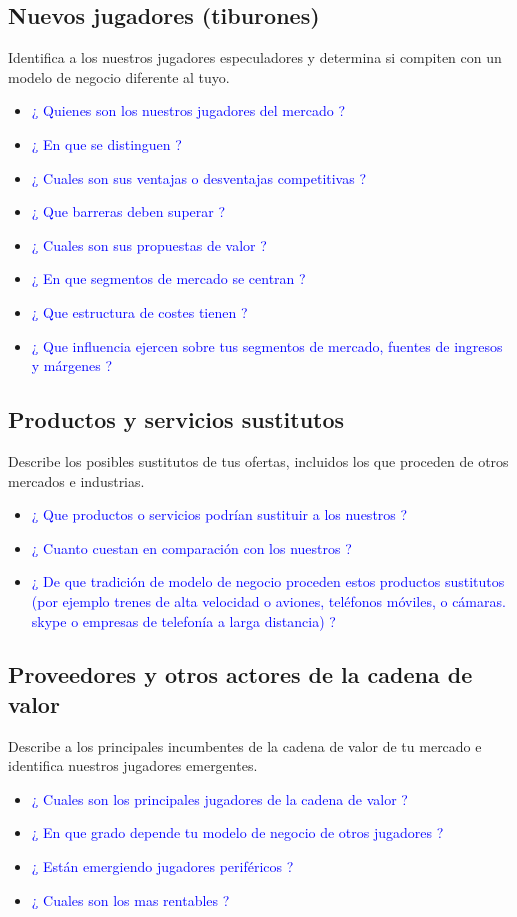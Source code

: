 \documentclass[11pt]{book}
\begin{document}
\subsection{Nuevos jugadores (tiburones)}
Identifica a los nuestros jugadores especuladores y determina si compiten con un modelo de negocio diferente al tuyo.
\begin{itemize}
\item\textcolor{blue}{¿ Quienes son los nuestros jugadores del mercado ?}
\item\textcolor{blue}{¿ En que se distinguen ?}
\item\textcolor{blue}{¿ Cuales son sus ventajas o desventajas competitivas ?}
\item\textcolor{blue}{¿ Que barreras deben superar ?}
\item\textcolor{blue}{¿ Cuales son sus propuestas de valor ?}
\item\textcolor{blue}{¿ En que segmentos de mercado se centran ?}
\item\textcolor{blue}{¿ Que estructura de costes tienen ?}
\item\textcolor{blue}{¿ Que influencia ejercen sobre tus segmentos de mercado, fuentes de ingresos y márgenes ?}
\end{itemize}
\subsection{Productos y servicios sustitutos}
Describe los posibles sustitutos de tus ofertas, incluidos los que proceden de otros mercados e industrias.
\begin{itemize}
\item\textcolor{blue}{¿ Que productos o servicios podrían sustituir a los nuestros ?}
\item\textcolor{blue}{¿ Cuanto cuestan en comparación con los nuestros ?}
\item\textcolor{blue}{¿ De que tradición de modelo de negocio proceden estos productos sustitutos (por ejemplo trenes de alta velocidad o aviones, teléfonos móviles, o cámaras. skype o empresas de telefonía a larga distancia) ?}
\end{itemize}
\subsection{Proveedores y otros actores de la cadena de valor}
Describe a los principales incumbentes de la cadena de valor de tu mercado e identifica nuestros jugadores emergentes.
\begin{itemize}
\item\textcolor{blue}{¿ Cuales son los principales jugadores de la cadena de valor ?}
\item\textcolor{blue}{¿ En que grado depende tu modelo de negocio de otros jugadores ?}
\item\textcolor{blue}{¿ Están emergiendo jugadores periféricos ?}
\item\textcolor{blue}{¿ Cuales son los mas rentables ?}
\end{itemize}
\end{document}
